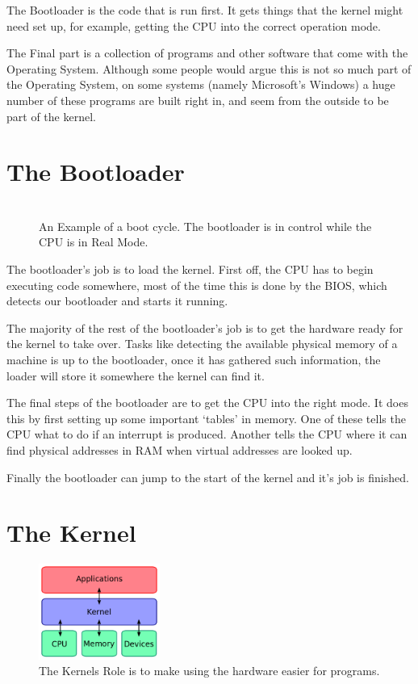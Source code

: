 \documentclass[a4paper]{report}
\begin{document}
The Bootloader is the code that is run first. It gets things that the kernel might need set up, for example, getting the CPU into the correct operation mode.

The Final part is a collection of programs and other software that come with the Operating System. Although some people would argue this is not so much part of the Operating System, on some systems (namely Microsoft's Windows) a huge number of these programs are built right in, and seem from the outside to be part of the kernel.

\section{The Bootloader}

\begin{figure}[ht]
\centering
\includegraphics[width=00px]{images/bootProcess.png}
\caption{An Example of a boot cycle. The bootloader is in control while the CPU is in Real Mode.}
\label{fig:theloader}
\end{figure}

The bootloader's job is to load the kernel. First off, the CPU has to begin executing code somewhere, most of the time this is done by the BIOS, which detects our bootloader and starts it running.

The majority of the rest of the bootloader's job is to get the hardware ready for the kernel to take over. Tasks like detecting the available physical memory of a machine is up to the bootloader, once it has gathered such information, the loader will store it somewhere the kernel can find it.

The final steps of the bootloader are to get the CPU into the right mode. It does this by first setting up some important `tables' in memory. One of these tells the CPU what to do if an interrupt is produced. Another tells the CPU where it can find physical addresses in RAM when virtual addresses are looked up.

Finally the bootloader can jump to the start of the kernel and it's job is finished.


\section{The Kernel}

\begin{figure}
\centering
\includegraphics[width=150px]{images/kernel}
\caption{The Kernels Role is to make using the hardware easier for programs.}
\vspace{-10pt}
\label{fig:thekernel}
\end{figure}
\end{document}
